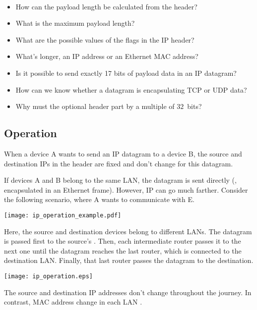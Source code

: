 \begin{exercise} \ \\[-0.5cm]
\begin{itemize}
\item How can the payload length be calculated from the header?
\item What is the maximum payload length?
\item What are the possible values of the flags in the IP header?
\item What's longer, an IP address or an Ethernet MAC address?
\item Is it possible to send exactly 17 bits of payload data in an IP datagram?
\item How can we know whether a datagram is encapsulating TCP or UDP data?
\item Why must the optional header part by a multiple of $32$~bits?
\end{itemize}
\end{exercise}

\subsection{Operation}

When a device A wants to send an IP datagram to a device B, the source and 
destination IPs in the header are fixed and don't change for this datagram.

If devices A and B belong to the same LAN, the datagram is sent directly
(\eg, encapsulated in an Ethernet frame). However, IP can go much farther.
Consider the following scenario, where A wants to communicate with E.

\begin{center}
 \texttt{[image: ip\_operation\_example.pdf]}
\end{center}


Here, the source and destination devices belong to different LANs.
The datagram is passed first to the source's .
Then, each intermediate router passes it to the next one until the datagram reaches 
the last router, which is connected to the destination LAN. Finally, that last router 
passes the datagram to the destination. 

\begin{center}
\texttt{[image: ip\_operation.eps]}
\end{center}

The source and destination IP addresses don't change throughout the journey.
In contrast, MAC address change in each LAN . 

